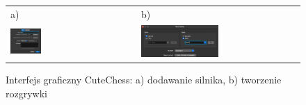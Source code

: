 \begin{figure}[ht]
    \centering
    \begin{tabular}{@{}ll@{}}
        a) & b) \\
        \includegraphics[width=0.25\textwidth]{dodatki/dodatekA/rysunki/instrukcja}
        &
        \includegraphics[width=0.5\textwidth]{dodatki/dodatekA/rysunki/nowa-gra}
    \end{tabular}
    \caption{Interfejs graficzny CuteChess: a) dodawanie silnika, b) tworzenie rozgrywki}
    \label{fig: integracja-z-gui}

\end{figure}


